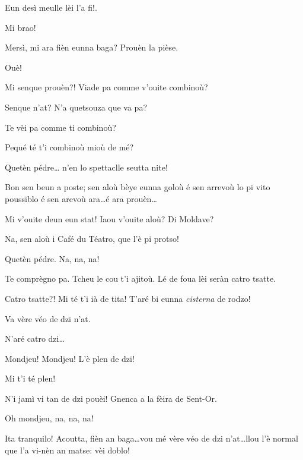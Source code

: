 \begin{drama}
\Marcospeaks{} \og Eun desì meulle lèi l'a fi!\fg .

\Joelspeaks Mi brao!

\Marcospeaks Mersì, mi ara fièn eunna baga? Prouèn la pièse.

\Joelspeaks Ouè!

\Cimaspeaks Mi senque prouèn?! Viade pa comme v'ouite combinoù?

\Joelspeaks{} Senque n'at? N'a quetsouza que va pa?

\Cimaspeaks Te vèi pa comme ti combinoù?

\Joelspeaks{} Pequé té t'i combinoù mioù de mé?

\Cimaspeaks Quetèn pédre\ldots {} n'en lo spettaclle seutta nite!

\Joelspeaks Bon sen beun a poste; sen aloù bèye eunna goloù é sen arrevoù lo pi vito poussiblo é sen arevoù ara\ldots é ara prouèn\ldots

\Cimaspeaks Mi v'ouite deun eun stat! Iaou v'ouite aloù? Di Moldave?

\Marcospeaks Na, sen aloù i Café du Téatro, que l'è pi protso!

\Cimaspeaks Quetèn pédre. Na, na, na!

\Joelspeaks Te comprègno pa. Tcheu le cou t'i ajitoù. Lé de foua  lèi seràn catro tsatte.

\Cimaspeaks Catro tsatte?! Mi té t'i ià de tita! T'aré bi eunna \textit{cisterna} de rodzo!

\Marcospeaks{} Va vère véo de dzi n'at.

\Joelspeaks{} N'aré catro dzi\ldots


\Joelspeaks{} Mondjeu! Mondjeu! L'è plen de dzi!

\Cimaspeaks{} Mi t'i té plen!

\Joelspeaks N'i jamì vi tan de dzi pouèi! Gnenca a la fèira de Sent-Or.

\Cimaspeaks Oh mondjeu, na, na, na!

\Marcospeaks{} Ita tranquilo! Acoutta, fièn an baga\ldots vou mé vère véo de dzi n'at\ldots llou  l'è normal que l'a vi-nèn an matse: vèi doblo!



\end{drama}
